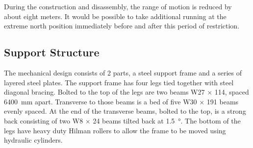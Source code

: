 During the  construction and  disassembly, the
 range of motion is reduced by about eight meters. It
would be possible to take additional running at the extreme
north position immediately before and after this period of restriction.

\subsection{Support Structure}
\label{sec:tms-des-structure}
The mechanical design consists of 2 parts, a steel support frame and a series of layered steel plates.  The support frame has four legs tied together with steel diagonal bracing. Bolted to the top of the legs are two beams W27 $\times$ 114, spaced \SI{6400}{\mm} apart. Transverse to those beams is a bed of five W30 $\times$ 191 beams evenly spaced. At the end of the transverse beams, bolted to the top, is a strong back consisting of two W8 $\times$ 24 beams tilted back at \SI{1.5}{\degree}. The bottom of the legs have heavy duty Hilman rollers to allow the frame to be moved using hydraulic cylinders.



